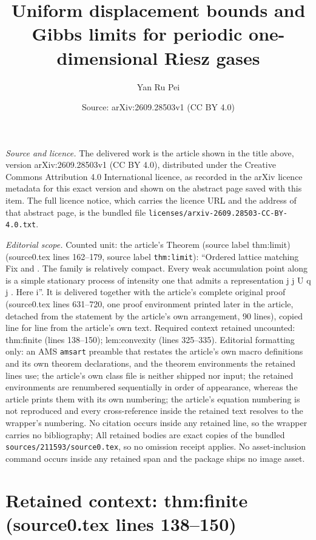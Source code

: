 \documentclass[10pt,a4paper]{amsart}
\title[Uniform displacement bounds and Gibbs limits for periodic one-dimensional Riesz gases]{Uniform displacement bounds and Gibbs limits for periodic one-dimensional Riesz gases}
\author{Yan Ru Pei}
\date{Source: arXiv:2609.28503v1 (CC BY 4.0)}
\theoremstyle{plain}
\theoremstyle{remark}
\begin{document}
\maketitle

\noindent\emph{Source and licence.} The delivered work is the article shown in the title above, version arXiv:2609.28503v1 (CC BY 4.0), distributed under the Creative Commons Attribution 4.0 International licence, as recorded in the arXiv licence metadata for this exact version and shown on the abstract page saved with this item. The full licence notice, which carries the licence URL and the address of that abstract page, is the bundled file \texttt{licenses/arxiv-2609.28503-CC-BY-4.0.txt}.
\par\smallskip

\noindent\textit{Editorial scope.} Counted unit: the article's Theorem (source label thm:limit) (source0.tex lines 162--179, source label \texttt{thm:limit}): ``Ordered lattice matching Fix and . The family is relatively compact. Every weak accumulation point along is a simple stationary process of intensity one that admits a representation j j U q j . Here i''. It is delivered together with the article's complete original proof (source0.tex lines 631--720, one proof environment printed later in the article, detached from the statement by the article's own arrangement, 90 lines), copied line for line from the article's own text. Required context retained uncounted: thm:finite (lines 138--150); lem:convexity (lines 325--335). Editorial formatting only: an AMS \texttt{amsart} preamble that restates the article's own macro definitions and its own theorem declarations, and the theorem environments the retained lines use; the article's own class file is neither shipped nor input; the retained environments are renumbered sequentially in order of appearance, whereas the article prints them with its own numbering; the article's equation numbering is not reproduced and every cross-reference inside the retained text resolves to the wrapper's numbering. No citation occurs inside any retained line, so the wrapper carries no bibliography; All retained bodies are exact copies of the bundled \texttt{sources/211593/source0.tex}, so no omission receipt applies. No asset-inclusion command occurs inside any retained span and the package ships no image asset.


\section*{Retained context: thm:finite (source0.tex lines 138--150)}
\end{document}
